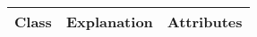 																			


\begin{table}
\centering
\begin{tabular}{l|l|l} 

Class    & Explanation                                                                                                                                                & Attributes                                                                                                                                                                                                                                                                                                                                                                                                                                                                                                                                                                                                                                                                                                                                                                                                                                                                                                                                                                                                                                                                                                                                                                                                                                                                                                                     \\ 
\hline

\end{tabular}
\end{table}
